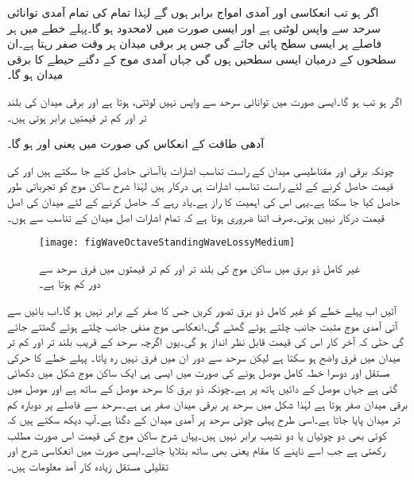 اگر  ہو تب انعکاسی اور آمدی امواج برابر ہوں گے لہٰذا تمام کی تمام آمدی توانائی سرحد سے واپس لوٹتی ہے اور ایسی صورت میں  لامحدود ہو گا۔پہلے خطے میں ہر  فاصلے پر ایسی سطح  پائی جائے گی جس پر برقی میدان ہر وقت صفر رہتا ہے۔ان سطحوں کے درمیان ایسی سطحیں ہوں گی جہاں آمدی موج کے دگنے حیطے کا برقی میدان ہو گا۔

اگر  ہو تب  ہو گا۔ایسی صورت میں توانائی سرحد سے واپس نہیں لوٹتی،  ہوتا ہے اور برقی میدان کی بلند تر اور کم تر قیمتیں برابر ہوتی ہیں۔

آدھی طاقت کے انعکاس کی صورت میں  یعنی  اور  ہو گا۔ 

چونکہ برقی اور مقناطیسی میدان کے راست تناسب اشارات باآسانی حاصل کئے جا سکتے ہیں اور  کی قیمت حاصل کرنے کے لئے راست تناسب اشارات ہی درکار ہیں لہٰذا شرح ساکن موج کو تجرباتی طور حاصل کیا جا سکتا ہے۔یہی اس کی اہمیت کا راز ہے۔یاد رہے کہ  حاصل کرنے کے لئے میدان کی اصل قیمت درکار نہیں ہوتی۔صرف اتنا ضروری ہوتا ہے کہ تمام اشارات اصل میدان کے تناسب سے ہوں۔

\begin{figure}
\centering
\texttt{[image: figWaveOctaveStandingWaveLossyMedium]}
\caption{غیر کامل ذو برق میں ساکن موج کی بلند تر اور کم تر قیمتوں میں فرق سرحد سے دور کم ہوتا ہے۔}
\label{شکل_موج_غیر_کامل_ذوبرق_ساکن_موج}
\end{figure}

آئیں اب پہلے خطے کو غیر کامل ذو برق تصور کریں جس کا  صفر کے برابر نہیں ہو گا۔اب بائیں سے آتی آمدی موج مثبت  جانب چلتے ہوئے گھٹے گی۔انعکاسی موج منفی  جانب چلتے ہوئے گھٹتے جائے گی حتٰی کہ آخر کار اس کی قیمت قابل نظر انداز ہو گی۔یوں اگرچہ سرحد کے قریب بلند تر اور کم تر میدان میں فرق  واضح ہو سکتا ہے لیکن سرحد سے دور ان میں فرق نہیں رہ پاتا۔ پہلے خطے کا حرکی مستقل  اور دوسرا خطہ کامل موصل ہونے کی صورت میں ایسی ہی ایک ساکن موج شکل  میں دکھائی گئی ہے جہاں موصل  کے دائیں ہاتھ پر ہے۔چونکہ ذو برق کا سرحد موصل کے ساتھ ہے اور موصل میں برقی میدان صفر ہوتا ہے لہٰذا شکل میں سرحد پر برقی میدان صفر ہی ہے۔سرحد سے  فاصلے پر دوبارہ کم تر میدان پایا جاتا ہے۔اسی طرح  پہلی چوٹی سرحد پر آمدی میدان کے دگنا ہے۔آپ دیکھ سکتے ہیں کہ کوئی بھی دو چوٹیاں یا دو نشیب برابر نہیں ہیں۔یہاں شرح ساکن موج کی قیمت اس صورت مطلب رکھتی ہے جب اسے ناپنے کا مقام یعنی  بھی ساتھ بتلایا جائے۔ایسی صورت میں انعکاسی شرح اور تقلیلی مستقل زیادہ کار آمد معلومات ہیں۔

